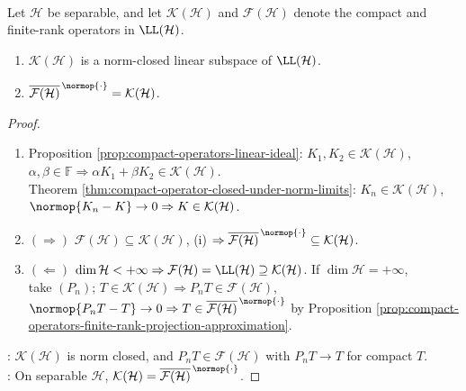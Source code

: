 \begin{corollary} \label{cor:compact-operators-finite-rank-dense-separable-hilbert} \\
Let $\mathcal{H}$ be separable, and let $\mathcal{K}(\mathcal{H})$ and $\mathcal{F}(\mathcal{H})$ denote the compact and finite-rank operators in $\LL(\mathcal{H})$.
\begin{enumerate}[label=(\roman*)]
\setlength{\itemsep}{0pt}
\item $\mathcal{K}(\mathcal{H})$ is a norm-closed linear subspace of $\LL(\mathcal{H})$.
\item $\overline{\mathcal{F}(\mathcal{H})}^{\,\normop{\cdot}}=\mathcal{K}(\mathcal{H})$.
\end{enumerate}
\begin{proof}
\begin{enumerate}[label=(\roman*)]
\setlength{\itemsep}{0pt}
\item Proposition \ref{prop:compact-operators-linear-ideal}: $K_1,K_2\in\mathcal{K}(\mathcal{H})$, $\alpha,\beta\in\mathbb{F}\Rightarrow\alpha K_1+\beta K_2\in\mathcal{K}(\mathcal{H})$.\\
Theorem \ref{thm:compact-operator-closed-under-norm-limits}: $K_n\in\mathcal{K}(\mathcal{H})$, $\normop{K_n-K}\to0\Rightarrow K\in\mathcal{K}(\mathcal{H})$.
\item[$(ii)$]$(\Rightarrow)$ $\mathcal{F}(\mathcal{H})\subseteq\mathcal{K}(\mathcal{H})$, (i) $\Rightarrow\overline{\mathcal{F}(\mathcal{H})}^{\,\normop{\cdot}}\subseteq\mathcal{K}(\mathcal{H})$.\\
\item[$(ii)$]$(\Leftarrow)$ $\dim\mathcal{H}<+\infty\Rightarrow\mathcal{F}(\mathcal{H})=\LL(\mathcal{H})\supseteq\mathcal{K}(\mathcal{H})$. If $\dim\mathcal{H}=+\infty$,\\
take $(P_n)$; $T\in\mathcal{K}(\mathcal{H})\Rightarrow P_nT\in\mathcal{F}(\mathcal{H})$, $\normop{P_nT-T}\to0\Rightarrow T\in\overline{\mathcal{F}(\mathcal{H})}^{\,\normop{\cdot}}$ by Proposition \ref{prop:compact-operators-finite-rank-projection-approximation}.
\end{enumerate}
: $\mathcal{K}(\mathcal{H})$ is norm closed, and $P_nT\in\mathcal{F}(\mathcal{H})$ with $P_nT\to T$ for compact $T$.\\
: On separable $\mathcal{H}$, $\mathcal{K}(\mathcal{H})=\overline{\mathcal{F}(\mathcal{H})}^{\,\normop{\cdot}}$.
\end{proof}
\end{corollary}

